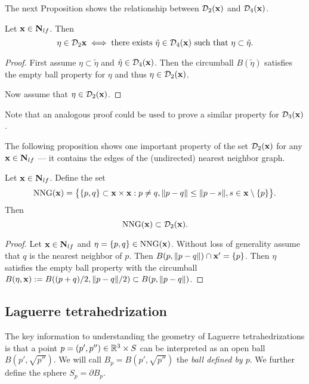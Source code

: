 The next Proposition shows the relationship between $\mathcal D_2({\mathbf{x}})$ and $\mathcal D_4({\mathbf{x}})$.
\begin{proposition}
	Let ${\mathbf{x}}\in\mathbf N_{lf}$. Then
	$$\eta \in \mathcal D_2{{\mathbf{x}}} \iff \text{there exists } \tilde\eta \in \mathcal D_4({\mathbf{x}}) \text{ such that } \eta\subset \tilde \eta.$$
\end{proposition}
\begin{proof}
	First assume $\eta \subset \tilde \eta$ and $\tilde\eta \in \mathcal D_4({\mathbf{x}})$. Then the circumball $B(\tilde\eta)$ satisfies the empty ball property for $\eta$ and thus $\eta \in \mathcal D_2({\mathbf{x}})$.

	Now assume that $\eta \in \mathcal D_2({\mathbf{x}})$. \tbd
\end{proof}
Note that an analogous proof could be used to prove a similar property for $\mathcal D_3({\mathbf{x}})$.\newline


\noindent The following proposition shows one important property of the set $\mathcal D_2({\mathbf{x}})$ for any ${\mathbf{x}} \in \mathbf N_{lf}$ --- it contains the edges of the (undirected) nearest neighbor graph.
\begin{proposition}\label{prop:nng}
	Let ${\mathbf{x}}\in\mathbf N_{lf}$. Define the set
	$$\mathrm{NNG}({\mathbf{x}}) = \big\{ \{p,q\}\subset {\mathbf{x}} \times {\mathbf{x}}: p\neq q, \|p-q\| \leq \|p-s\|, s\in {\mathbf{x}}\setminus\{p\}  \big\}.$$
	Then 
	$$\mathrm{NNG}({\mathbf{x}}) \subset \mathcal D_2({\mathbf{x}}).$$
\end{proposition}
\begin{proof}
	Let ${\mathbf{x}}\in \mathbf N_{lf}$ and $\eta =\{p,q\} \in \mathrm{NNG}({\mathbf{x}})$. Without loss of generality assume that $q$ is the nearest neighbor of $p$. Then $ B(p,\|p-q\|)\cap {\mathbf{x}}' = \{p\}$. Then $\eta$ satisfies the empty ball property with the circumball $ B(\eta,{\mathbf{x}}) := B((p+q)/2,\|p-q\|/2) \subset B(p,\|p-q\|)$.
\end{proof}



\subsection{Laguerre tetrahedrization}\label{sec:Laguerre}

The key information to understanding the geometry of Laguerre tetrahedrizations is that a point $p=(p',p'')\in {\mathbb R^3}\times S$ can be interpreted as an open ball $B(p',\sqrt{p''})$. We will call $B_p = B(p',\sqrt{p''})$ the \textit{ball defined by $p$}. We further define the sphere $S_p=\partial B_p$. 


